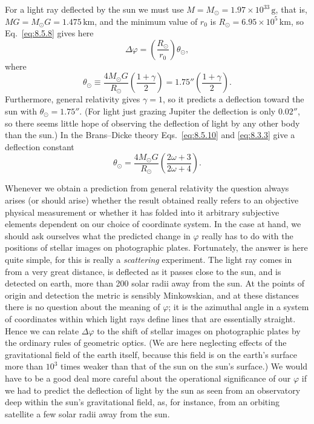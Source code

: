 For a light ray deflected by the sun we must use
\(M=M_\odot=1.97\times10^{33}\,\mathrm{g}\), that is,
\(MG=M_\odot G=1.475\,\mathrm{km}\), and the minimum value of \(r_0\) is
\(R_\odot=6.95\times10^5\,\mathrm{km}\), so Eq.~\eqref{eq:8.5.8} gives
here
\begin{equation}
  \Delta\varphi=\left(\frac{R_\odot}{r_0}\right)\theta_\odot,
  \tag{8.5.9}\label{eq:8.5.9}
\end{equation}
where
\begin{equation}
  \theta_\odot
  \equiv
  \frac{4M_\odot G}{R_\odot}
  \left(\frac{1+\gamma}{2}\right)
  =
  1.75''\left(\frac{1+\gamma}{2}\right).
  \tag{8.5.10}\label{eq:8.5.10}
\end{equation}
Furthermore, general relativity gives \(\gamma=1\), so it predicts a
deflection toward the sun with \(\theta_\odot=1.75''\). (For light just
grazing Jupiter the deflection is only \(0.02''\), so there seems little
hope of observing the deflection of light by any other body than the sun.)
In the Brans--Dicke theory Eqs.~\eqref{eq:8.5.10} and
\eqref{eq:8.3.3} give a deflection constant
\begin{equation}
  \theta_\odot
  =
  \frac{4M_\odot G}{R_\odot}
  \left(\frac{2\omega+3}{2\omega+4}\right).
  \tag{8.5.11}\label{eq:8.5.11}
\end{equation}

Whenever we obtain a prediction from general relativity the question always
arises (or should arise) whether the result obtained really refers to an
objective physical measurement or whether it has folded into it arbitrary
subjective elements dependent on our choice of coordinate system. In the
case at hand, we should ask ourselves what the predicted change in
\(\varphi\) really has to do with the positions of stellar images on
photographic plates. Fortunately, the answer is here quite simple, for this
is really a \emph{scattering} experiment. The light ray comes in from a very
great distance, is deflected as it passes close to the sun, and is detected
on earth, more than 200 solar radii away from the sun. At the points of
origin and detection the metric is sensibly Minkowskian, and at these
distances there is no question about the meaning of \(\varphi\); it is the
azimuthal angle in a system of coordinates within which light rays define
lines that are essentially straight. Hence we can relate \(\Delta\varphi\)
to the shift of stellar images on photographic plates by the ordinary rules
of geometric optics. (We are here neglecting effects of the gravitational
field of the earth itself, because this field is on the earth's surface more
than \(10^3\) times weaker than that of the sun on the sun's surface.) We
would have to be a good deal more careful about the operational significance
of our \(\varphi\) if we had to predict the deflection of light by the sun
as seen from an observatory deep within the sun's gravitational field, as,
for instance, from an orbiting satellite a few solar radii away from the
sun.

